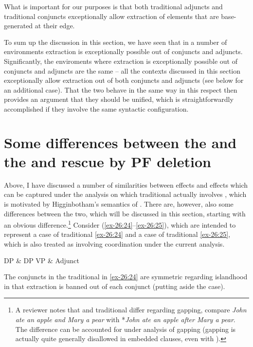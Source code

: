 \documentclass[output=paper]{langsci/langscibook}
\begin{document}
What is important for our purposes is that both traditional adjuncts and
traditional conjuncts exceptionally allow extraction of elements that are
base-ge\-ne\-rat\-ed at their edge.

To sum up the discussion in this section, we have seen that in a number of
environments extraction is exceptionally possible out of conjuncts and
adjuncts. Significantly, the enviroments where extraction is exceptionally
possible out of conjuncts and adjuncts are the same – all the contexts
discussed in this section exceptionally allow extraction out of both conjuncts
and adjuncts (see below for an additional case). That the two behave in the
same way in this respect then provides an argument that they should be unified,
which is straightforwardly accomplished if they involve the same syntactic
configuration.

\section{Some differences between the  and the
     and rescue by PF deletion}\label{sec:35.4}

Above, I have discussed a number of similarities between 
effects and  effects which can be captured under the analysis
on which traditional  actually involves , which is
motivated by Higginbotham’s semantics of . There are, however, also
some differences between the two, which will be discussed in this section,
starting with an obvious difference.\footnote{A reviewer notes that
     and traditional  differ regarding gapping, compare
    \emph{John ate an apple and Mary a pear} with *\emph{John ate an apple
    after Mary a pear}. The difference can be accounted for under  analysis of gapping (gapping is actually quite generally disallowed
in embedded clauses, even with ).} Consider (\ref{ex-26:24}--\ref{ex-26:25}), which are
intended to represent a case of traditional  \eqref{ex-26:24} and a case of
traditional  \eqref{ex-26:25}, which is also treated as involving coordination
under the current analysis.

\ea\label{ex-26:24} DP \& DP
\ex\label{ex-26:25} VP \& Adjunct
\z

The conjuncts in the traditional  in \eqref{ex-26:24} are symmetric regarding
islandhood in that extraction is banned out of each conjunct (putting aside the
 case).
\end{document}

